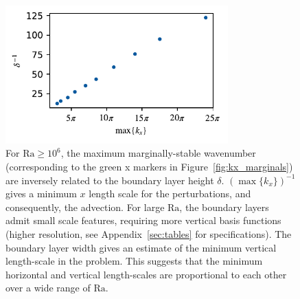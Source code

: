 \documentclass[reprint,amsmath,amssymb,aps,nofootinbib]{revtex4-1}
\newcommand\Ra{\mathrm{Ra}}
\begin{document}
\begin{figure}
    \centering
    \includegraphics[width=3.375in]{del_kx_inv.pdf}
    \caption{For $\Ra \geq 10^6$, the maximum marginally-stable wavenumber (corresponding to the green x markers in Figure~\ref{fig:kx_marginals}) are inversely related to the boundary layer height $\delta$. 
    $(\max \{ k_x \})^{-1}$ gives a minimum $x$ length scale for the perturbations, and consequently, the advection. 
    For large $\Ra$, the boundary layers admit small scale features, requiring more vertical basis functions (higher resolution, see Appendix~\ref{sec:tables} for specifications).
    The boundary layer width gives an estimate of the minimum vertical length-scale in the problem.
    This suggests that the minimum horizontal and vertical length-scales are proportional to each other over a wide range of $\Ra$.}
    \label{fig:del_inv}
\end{figure}
\end{document}
